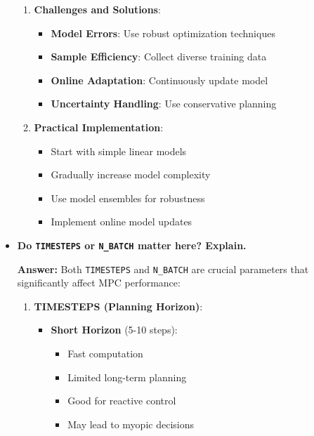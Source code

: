 \begin{itemize}
\begin{enumerate}
        \item \textbf{Challenges and Solutions}:
        \begin{itemize}
            \item \textbf{Model Errors}: Use robust optimization techniques
            \item \textbf{Sample Efficiency}: Collect diverse training data
            \item \textbf{Online Adaptation}: Continuously update model
            \item \textbf{Uncertainty Handling}: Use conservative planning
        \end{itemize}
        
        \item \textbf{Practical Implementation}:
        \begin{itemize}
            \item Start with simple linear models
            \item Gradually increase model complexity
            \item Use model ensembles for robustness
            \item Implement online model updates
        \end{itemize}
    \end{enumerate}
    
    \item \textbf{Do \texttt{TIMESTEPS} or \texttt{N\_BATCH} matter here? Explain.}
    
    \textbf{Answer:} Both \texttt{TIMESTEPS} and \texttt{N\_BATCH} are crucial parameters that significantly affect MPC performance:
    
    \begin{enumerate}
        \item \textbf{TIMESTEPS (Planning Horizon)}:
        \begin{itemize}
            \item \textbf{Short Horizon} (5-10 steps):
            \begin{itemize}
                \item Fast computation
                \item Limited long-term planning
                \item Good for reactive control
                \item May lead to myopic decisions
            \end{itemize}
            

\end{itemize}
\end{enumerate}
\end{itemize}
